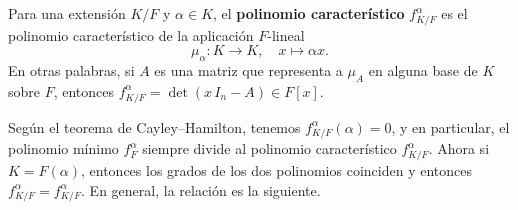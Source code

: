 \begin{definicion}
  Para una extensión $K/F$ y $\alpha \in K$, el
  \textbf{polinomio característico} $f^\alpha_{K/F}$ es el polinomio
  característico de la aplicación $F$-lineal
  $$\mu_\alpha\colon K \to K, \quad x\mapsto \alpha x.$$
  En otras palabras, si $A$ es una matriz que representa a $\mu_A$ en alguna
  base de $K$ sobre $F$, entonces $f^\alpha_{K/F} = \det (x\,I_n - A) \in F[x]$.
\end{definicion}

Según el teorema de Cayley--Hamilton, tenemos $f^\alpha_{K/F} (\alpha) = 0$,
y en particular, el polinomio mínimo $f^\alpha_F$ siempre divide al polinomio
característico $f^\alpha_{K/F}$. Ahora si $K = F (\alpha)$, entonces los grados
de los dos polinomios coinciden y entonces $f^\alpha_{K/F} = f^\alpha_{K/F}$.
En general, la relación es la siguiente.

